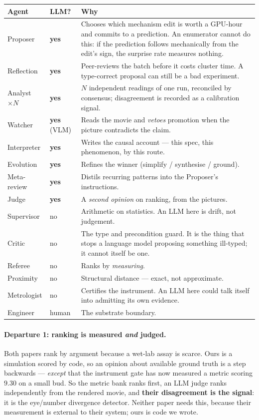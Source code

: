 \documentclass[11pt]{article}
\begin{document}
\begin{center}\small
\begin{tabular}{@{}p{2.4cm}p{1.9cm}p{9.6cm}@{}}
\toprule
\textbf{Agent} & \textbf{LLM?} & \textbf{Why} \\
\midrule
Proposer     & \textbf{yes} & Chooses which mechanism edit is worth a GPU-hour and commits to a
prediction. An enumerator cannot do this: if the prediction follows mechanically from the edit's
sign, the surprise rate measures nothing. \\
Reflection   & \textbf{yes} & Peer-reviews the batch before it costs cluster time. A type-correct
proposal can still be a bad experiment. \\
Analyst $\times N$ & \textbf{yes} & $N$ independent readings of one run, reconciled by consensus;
disagreement is recorded as a calibration signal. \\
Watcher      & \textbf{yes} (VLM) & Reads the movie and \emph{vetoes} promotion when the picture
contradicts the claim. \\
Interpreter  & \textbf{yes} & Writes the causal account --- this spec, this phenomenon, by this
route. \\
Evolution    & \textbf{yes} & Refines the winner (simplify / synthesise / ground). \\
Meta-review  & \textbf{yes} & Distils recurring patterns into the Proposer's instructions. \\
Judge        & \textbf{yes} & A \emph{second opinion} on ranking, from the pictures. \\
\midrule
Supervisor   & no & Arithmetic on statistics. An LLM here is drift, not judgement. \\
Critic       & no & The type and precondition guard. It is the thing that stops a language model
proposing something ill-typed; it cannot itself be one. \\
Referee      & no & Ranks by \emph{measuring}. \\
Proximity    & no & Structural distance --- exact, not approximate. \\
Metrologist  & no & Certifies the instrument. An LLM here could talk itself into admitting its
own evidence. \\
Engineer     & human & The substrate boundary. \\
\bottomrule
\end{tabular}
\end{center}

\paragraph{Departure 1: ranking is measured \emph{and} judged.}
Both papers rank by argument because a wet-lab assay is scarce. Ours is a simulation scored by
code, so an opinion about available ground truth is a step backwards --- \emph{except} that the
instrument gate has now measured a metric scoring $9.30$ on a small bud. So the metric bank ranks
first, an LLM judge ranks independently from the rendered movie, and \textbf{their disagreement
is the signal}: it is the eye/number divergence detector. Neither paper needs this, because
their measurement is external to their system; ours is code we wrote.
\end{document}
